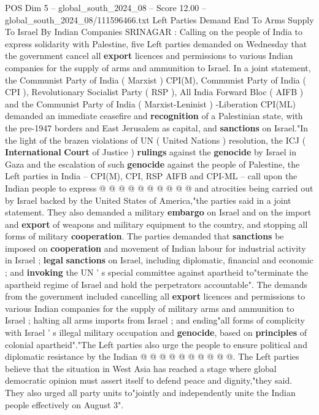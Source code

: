 \begin{textsample}{POS Dim 5 – global\_south\_2024\_08 – Score 12.00 – global\_south\_2024\_08/111596466.txt}  \label{ex:f5_pos_328}
Left Parties Demand End To Arms Supply To Israel By Indian Companies SRINAGAR : Calling on the people of India to express solidarity with Palestine, five Left parties demanded on Wednesday that the government cancel all \textbf{export} licences and permissions to various Indian companies for the supply of arms and ammunition to Israel.
In a joint statement, the Communist Party of India ( Marxist ) CPI(M), Communist Party of India ( CPI ), Revolutionary Socialist Party ( RSP ), All India Forward Bloc ( AIFB ) and the Communist Party of India ( Marxist-Leninist ) -Liberation CPI(ML) demanded an immediate ceasefire and \textbf{recognition} of a Palestinian state, with the pre-1947 borders and East Jerusalem as capital, and \textbf{sanctions} on Israel."In the light of the brazen violations of UN ( United Nations ) resolution, the ICJ ( \textbf{International} \textbf{Court} of Justice ) \textbf{rulings} against the \textbf{genocide} by Israel in Gaza and the escalation of such \textbf{genocide} against the people of Palestine, the Left parties in India -- CPI(M), CPI, RSP AIFB and CPI-ML -- call upon the Indian people to express @ @ @ @ @ @ @ @ @ @ and atrocities being carried out by Israel backed by the United States of America,"the parties said in a joint statement.
They also demanded a military \textbf{embargo} on Israel and on the import and \textbf{export} of weapons and military equipment to the country, and stopping all forms of military \textbf{cooperation}.
The parties demanded that \textbf{sanctions} be imposed on \textbf{cooperation} and movement of Indian labour for industrial activity in Israel ; \textbf{legal} \textbf{sanctions} on Israel, including diplomatic, financial and economic ; and \textbf{invoking} the UN ' s special committee against apartheid to"terminate the apartheid regime of Israel and hold the perpetrators accountable".
The demands from the government included cancelling all \textbf{export} licences and permissions to various Indian companies for the supply of military arms and ammunition to Israel ; halting all arms imports from Israel ; and ending"all forms of complicity with Israel ' s illegal military occupation and \textbf{genocide}, based on \textbf{principles} of colonial apartheid"."The Left parties also urge the people to ensure political and diplomatic resistance by the Indian @ @ @ @ @ @ @ @ @ @.
The Left parties believe that the situation in West Asia has reached a stage where global democratic opinion must assert itself to defend peace and dignity,"they said.
They also urged all party units to"jointly and independently unite the Indian people effectively on August 3".

\end{textsample}
